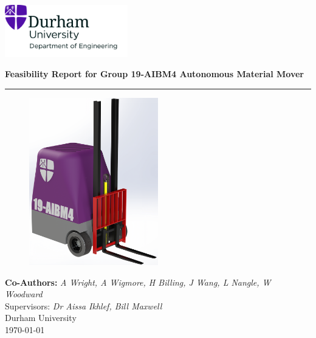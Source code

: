 \documentclass[12pt]{article}
\begin{document}



 
\begin{titlepage}
\centering
\includegraphics[width=0.4\textwidth]{UoD_Engineering.jpg} \\
\vspace{10mm}

{\LARGE \textbf{Feasibility Report for Group 19-AIBM4 Autonomous Material Mover}} \\[10pt]

\vspace{5mm}\hrule\vspace{0mm}

\begin{figure}[h!]
    \centering
     \includegraphics[width=0.5\textwidth]{Initial Final Front View.png}
\end{figure}  
\vspace{0mm}
\vspace{10mm}

{\large \textbf{Co-Authors: }\textit{A Wright, A Wigmore, H Billing, J Wang, L Nangle, W Woodward}} \\ \vspace{1mm}
{Supervisors:\textit{ Dr Aissa Ikhlef, Bill Maxwell}} \\[10pt]
{\small Durham University \\ \today}
\end{titlepage}
\end{document}

